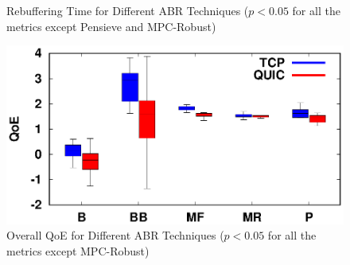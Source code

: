 \begin{figure}[!t]
\begin{minipage}[t]{0.48\linewidth}
		\caption{\label{fig:RebufferTime_n}Rebuffering Time for Different ABR Techniques ($p<0.05$ for all the metrics except Pensieve and MPC-Robust)}
	\end{minipage}\hfill
	\begin{minipage}[t]{0.48\linewidth}
		\includegraphics[width=\linewidth]{img/newexp/qoe_box}
		\caption{\label{fig:QOE_n}Overall QoE for Different ABR Techniques ($p<0.05$ for all the metrics except MPC-Robust)}
	\end{minipage}
\end{figure}


